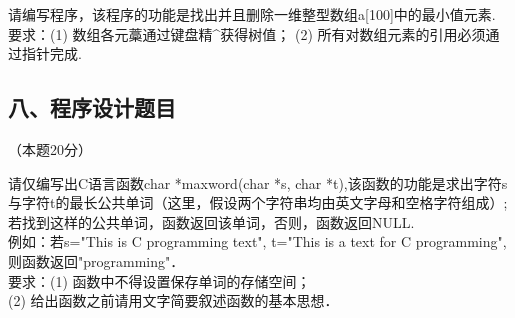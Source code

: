 请编写程序，该程序的功能是找出并且删除一维整型数组a[100]中的最小值元素. \\
要求：(1) 数组各元藁通过键盘精^获得树值；
(2) 所有对数组元素的引用必须通过指针完成.

\subsection{八、程序设计题目}
（本题20分）

请仅编写出C语言函数char *maxword(char *s, char *t),该函数的功能是求出字符s与字符t的最长公共单词（这里，假设两个字符串均由英文字母和空格字符组成）;若找到这样的公共单词，函数返回该单词，否则，函数返回NULL. \\
例如：若s="This is C programming text", t="This is a text for C programming",则函数返回"programming"． \\
要求：(1) 函数中不得设置保存单词的存储空间； \\
     (2) 给出函数之前请用文字简要叙述函数的基本思想．
